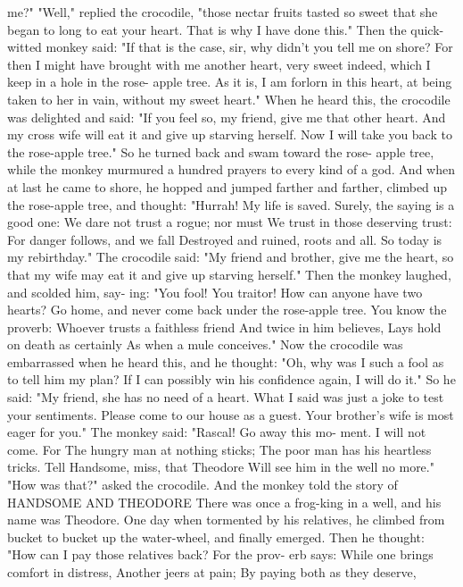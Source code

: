 \documentclass{book}
\begin{document}
me?"
"Well," replied the crocodile, "those nectar fruits
tasted so sweet that she began to long to eat your
heart. That is why I have done this."
Then the quick-witted monkey said: "If that is
the case, sir, why didn't you tell me on shore? For
then I might have brought with me another heart,
very sweet indeed, which I keep in a hole in the rose-
apple tree. As it is, I am forlorn in this heart, at
being taken to her in vain, without my sweet heart."
When he heard this, the crocodile was delighted
and said: "If you feel so, my friend, give me that
other heart. And my cross wife will eat it and give
up starving herself. Now I will take you back to the
rose-apple tree."
So he turned back and swam toward the rose-
apple tree, while the monkey murmured a hundred
prayers to every kind of a god. And when at last he
came to shore, he hopped and jumped farther and
farther, climbed up the rose-apple tree, and thought:
"Hurrah! My life is saved. Surely, the saying is a
good one:
We dare not trust a rogue; nor must
We trust in those deserving trust:
For danger follows, and we fall
Destroyed and ruined, roots and all.
So today is my rebirthday."
The crocodile said: "My friend and brother,
give me the heart, so that my wife may eat it and give
up starving herself."
Then the monkey laughed, and scolded him, say-
ing: "You fool! You traitor! How can anyone have
two hearts? Go home, and never come back under
the rose-apple tree. You know the proverb:
Whoever trusts a faithless friend
And twice in him believes,
Lays hold on death as certainly
As when a mule conceives."
Now the crocodile was embarrassed when he
heard this, and he thought: "Oh, why was I such a
fool as to tell him my plan? If I can possibly win his
confidence again, I will do it." So he said: "My
friend, she has no need of a heart. What I said was
just a joke to test your sentiments. Please come to
our house as a guest. Your brother's wife is most
eager for you."
The monkey said: "Rascal! Go away this mo-
ment. I will not come. For
The hungry man at nothing sticks;
The poor man has his heartless tricks.
Tell Handsome, miss, that Theodore
Will see him in the well no more."
"How was that?" asked the crocodile. And the
monkey told the story of
HANDSOME AND THEODORE
There was once a frog-king in a well, and his name
was Theodore. One day when tormented by his
relatives, he climbed from bucket to bucket up the
water-wheel, and finally emerged. Then he thought:
"How can I pay those relatives back? For the prov-
erb says:
While one brings comfort in distress,
Another jeers at pain;
By paying both as they deserve,
\end{document}
